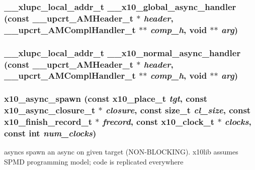 \subsubsection{\setlength{\rightskip}{0pt plus 5cm}\_\-\_\-xlupc\_\-local\_\-addr\_\-t \_\-\_\-x10\_\-global\_\-async\_\-handler (const \_\-\_\-upcrt\_\-AMHeader\_\-t $\ast$ {\em header}, \_\-\_\-upcrt\_\-AMCompl\-Handler\_\-t $\ast$$\ast$ {\em comp\_\-h}, void $\ast$$\ast$ {\em arg})\hspace{0.3cm}{\tt  [static]}}\label{async_8cc_a15}


\subsubsection{\setlength{\rightskip}{0pt plus 5cm}\_\-\_\-xlupc\_\-local\_\-addr\_\-t \_\-\_\-x10\_\-normal\_\-async\_\-handler (const \_\-\_\-upcrt\_\-AMHeader\_\-t $\ast$ {\em header}, \_\-\_\-upcrt\_\-AMCompl\-Handler\_\-t $\ast$$\ast$ {\em comp\_\-h}, void $\ast$$\ast$ {\em arg})\hspace{0.3cm}{\tt  [static]}}\label{async_8cc_a14}


\subsubsection{ x10\_\-async\_\-spawn (const {\bf x10\_\-place\_\-t} {\em tgt}, const {\bf x10\_\-async\_\-closure\_\-t} $\ast$ {\em closure}, const size\_\-t {\em cl\_\-size}, const {\bf x10\_\-finish\_\-record\_\-t} $\ast$ {\em frecord}, const {\bf x10\_\-clock\_\-t} $\ast$ {\em clocks}, const int {\em num\_\-clocks})}\label{async_8cc_a17}


asyncs spawn an async on given target (NON-BLOCKING). x10lib assumes SPMD programming model; code is replicated everywhere 

